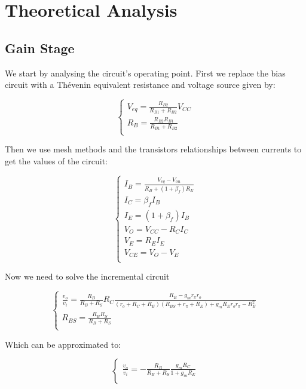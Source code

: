 \section{Theoretical Analysis}
\label{sec:analysis}

\subsection{Gain Stage}
We start by analysing the circuit's operating point.
First we replace the bias circuit with a Thévenin equivalent resistance and voltage source given by:

\begin{equation}\label{eq:v_eq}
\begin{cases}
V_{eq}=\frac{R_{B2}}{R_{B1}+R_{B2}} V_{CC} \\
R_B=\frac{R_{B2}R_{B1}}{R_{B1}+R_{B2}}\\
\end{cases}
\end{equation}

Then we use mesh methods and the transistors relationships between currents to get the values of the circuit:

\begin{equation}\label{eq:v_eq}
\begin{cases}
I_B=\frac{V_{eq}-V_{on}}{R_B+(1+\beta_f)R_{E}}\\
I_C=\beta_f I_B\\
I_E=(1+\beta_f)I_B\\
V_O=V_{CC}-R_C I_C\\
V_E=R_E I_E\\
V_{CE}=V_O-V_E\\
\end{cases}
\end{equation}

Now we need to solve the incremental circuit

\begin{equation}\label{eq:v_eq}
\begin{cases}
\frac{v_o}{v_i}=\frac{R_B}{R_B+R_S} R_C \frac{R_E-g_m r_\pi r_o}{(r_o+R_C+R_E)(R_{BS}+r_\pi+R_E)+g_m R_E r_o r_\pi - R_E^2}\\
R_{BS}=\frac{R_B R_S}{R_B+R_S}\\
\end{cases}
\end{equation}

Which can be approximated to:

\begin{equation}\label{eq:v_eq}
\begin{cases}
\frac{v_o}{v_i}=-\frac{R_B}{R_B+R_S} \frac{g_m R_C}{1+g_m R_E}\\
\end{cases}
\end{equation}

